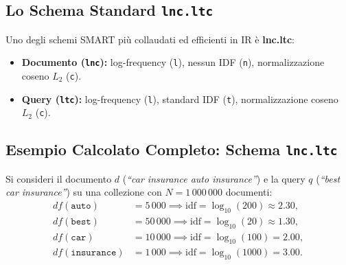 \subsection{Lo Schema Standard \texttt{lnc.ltc}}
Uno degli schemi SMART pi\`u collaudati ed efficienti in IR \`e \textbf{lnc.ltc}:
\begin{itemize}
    \item \textbf{Documento (\texttt{lnc}):} log-frequency (\texttt{l}), nessun IDF (\texttt{n}), normalizzazione coseno $L_2$ (\texttt{c}).
    \item \textbf{Query (\texttt{ltc}):} log-frequency (\texttt{l}), standard IDF (\texttt{t}), normalizzazione coseno $L_2$ (\texttt{c}).
\end{itemize}

\subsection{Esempio Calcolato Completo: Schema \texttt{lnc.ltc}}

Si consideri il documento $d$ (\textit{``car insurance auto insurance''}) e la query $q$ (\textit{``best car insurance''}) su una collezione con $N = 1\,000\,000$ documenti:
\begin{align*}
df(\texttt{auto}) &= 5\,000 \implies \text{idf} = \log_{10}(200) \approx 2.30, \\
df(\texttt{best}) &= 50\,000 \implies \text{idf} = \log_{10}(20) \approx 1.30, \\
df(\texttt{car}) &= 10\,000 \implies \text{idf} = \log_{10}(100) = 2.00, \\
df(\texttt{insurance}) &= 1\,000 \implies \text{idf} = \log_{10}(1000) = 3.00.
\end{align*}

\begin{table}[H]
\centering
\small
{}
\caption{Calcolo passo-passo del punteggio di similarit\`a con schema SMART lnc.ltc.}
\label{tab:smart-worked-example}
\end{table}

